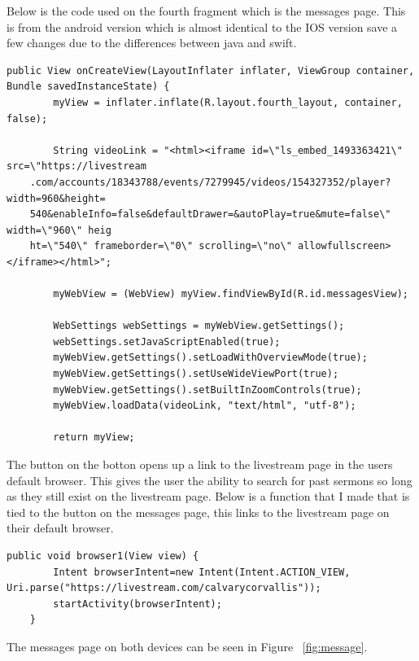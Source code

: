 \documentclass[letterpaper,10pt,draftclsnofoot,onecolumn,titlepage]{IEEEtran}
\begin{document}
		Below is the code used on the fourth fragment which is the messages page.
		This is from the android version which is almost identical to the IOS version save a few changes due to the differences between java and swift.
		\begin{lstlisting}
public View onCreateView(LayoutInflater inflater, ViewGroup container, Bundle savedInstanceState) {
        myView = inflater.inflate(R.layout.fourth_layout, container, false);

        String videoLink = "<html><iframe id=\"ls_embed_1493363421\" src=\"https://livestream
	.com/accounts/18343788/events/7279945/videos/154327352/player?width=960&height=
	540&enableInfo=false&defaultDrawer=&autoPlay=true&mute=false\" width=\"960\" heig
	ht=\"540\" frameborder=\"0\" scrolling=\"no\" allowfullscreen> </iframe></html>";

        myWebView = (WebView) myView.findViewById(R.id.messagesView);

        WebSettings webSettings = myWebView.getSettings();
        webSettings.setJavaScriptEnabled(true);
        myWebView.getSettings().setLoadWithOverviewMode(true);
        myWebView.getSettings().setUseWideViewPort(true);
        myWebView.getSettings().setBuiltInZoomControls(true);
        myWebView.loadData(videoLink, "text/html", "utf-8");

        return myView;
		\end{lstlisting}
		The button on the botton opens up a link to the livestream page in the users default browser.
		This gives the user the ability to search for past sermons so long as they still exist on the livestream page.
		Below is a function that I made that is tied to the button on the messages page, this links to the livestream page on their default browser.
		\begin{lstlisting}
public void browser1(View view) {
        Intent browserIntent=new Intent(Intent.ACTION_VIEW, Uri.parse("https://livestream.com/calvarycorvallis"));
        startActivity(browserIntent);
    }

		\end{lstlisting}

	

		The messages page on both devices can be seen in Figure ~\ref{fig:message}.
\end{document}
